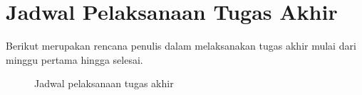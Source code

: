\section{Jadwal Pelaksanaan Tugas Akhir}

Berikut merupakan rencana penulis dalam melaksanakan tugas akhir mulai dari minggu pertama hingga selesai.


\begin{figure}[ht]
  \centering
  \qquad
  \caption{Jadwal pelaksanaan tugas akhir}
\end{figure}